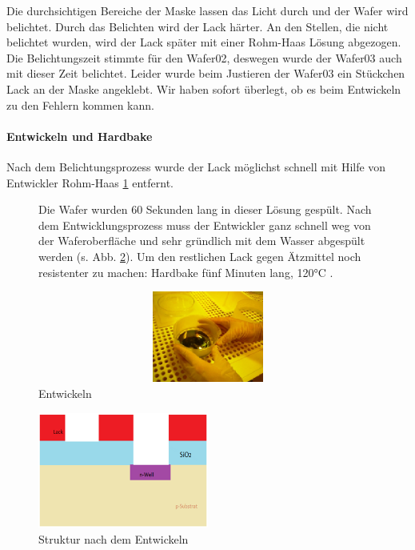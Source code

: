 Die durchsichtigen Bereiche der Maske lassen das Licht durch und der Wafer wird belichtet.
Durch das Belichten wird der Lack härter. An den Stellen, die nicht belichtet wurden,
wird der Lack später mit einer Rohm-Haas Lösung abgezogen.
Die Belichtungszeit stimmte für den Wafer02, deswegen wurde der Wafer03 auch mit dieser Zeit belichtet. Leider wurde beim Justieren der Wafer03 ein Stückchen Lack an der Maske angeklebt. Wir haben sofort überlegt, ob es beim Entwickeln zu den Fehlern kommen kann.



\paragraph[Entwickeln und Hardbake ]{Entwickeln und Hardbake }

Nach dem Belichtungsprozess wurde der Lack möglichst schnell mit Hilfe von Entwickler Rohm-Haas \ref{fig:Entwickeln} entfernt.
\begin{figure}[H]
\begin{minipage}[hbt]{10cm}
Die Wafer wurden 60 Sekunden lang in dieser Lösung gespült.
Nach dem Entwicklungsprozess muss der Entwickler ganz schnell weg von der Waferoberfläche und sehr gründlich mit dem Wasser abgespült werden (s. Abb. \ref{fig:strukturnachdementwickeln}).
Um den restlichen Lack gegen Ätzmittel noch resistenter zu machen: Hardbake fünf Minuten lang, 120°C .

\end{minipage}
\begin{minipage}[hbt]{4.5cm}
    \centering
    \includegraphics[width=1\textwidth,height=3cm]{bilder/Entwickeln.png}
  \caption{Entwickeln}
  \label{fig:Entwickeln}
\end{minipage}

\end{figure}

\begin{figure}[H]
    \centering
        \includegraphics[width=0.5\textwidth]{bilder/StrukturnachdemEntwickeln.png}
    \caption{Struktur nach dem Entwickeln}
    \label{fig:strukturnachdementwickeln}
\end{figure}

